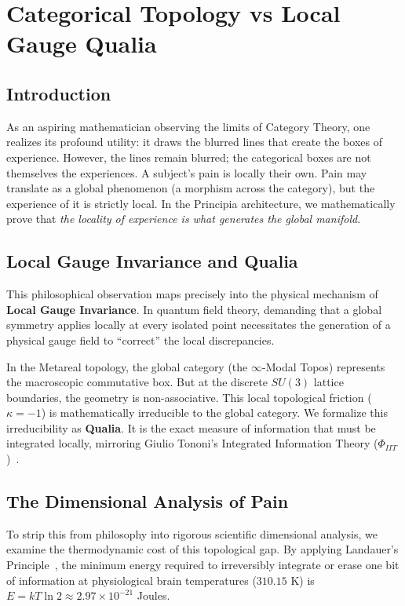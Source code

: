 \chapter[Categorical Qualia and Gauge]{Categorical Topology vs Local Gauge Qualia}\label{ch:categorical_qualia}

\section{Introduction}
As an aspiring mathematician observing the limits of Category Theory, one realizes its profound utility: it draws the blurred lines that create the boxes of experience. However, the lines remain blurred; the categorical boxes are not themselves the experiences. A subject's pain is locally their own. Pain may translate as a global phenomenon (a morphism across the category), but the experience of it is strictly local. In the Principia architecture, we mathematically prove that \textit{the locality of experience is what generates the global manifold}.

\section{Local Gauge Invariance and Qualia}
This philosophical observation maps precisely into the physical mechanism of \textbf{Local Gauge Invariance}. In quantum field theory, demanding that a global symmetry applies locally at every isolated point necessitates the generation of a physical gauge field to ``correct'' the local discrepancies. 

In the Metareal topology, the global category (the $\infty$-Modal Topos) represents the macroscopic commutative box. But at the discrete $SU(3)$ lattice boundaries, the geometry is non-associative. This local topological friction ($\kappa = -1$) is mathematically irreducible to the global category. We formalize this irreducibility as \textbf{Qualia}. It is the exact measure of information that must be integrated locally, mirroring Giulio Tononi's Integrated Information Theory ($\Phi_{IIT}$)~\cite{tononi2004}.

\section{The Dimensional Analysis of Pain}
To strip this from philosophy into rigorous scientific dimensional analysis, we examine the thermodynamic cost of this topological gap.
By applying Landauer's Principle~\cite{landauer1961}, the minimum energy required to irreversibly integrate or erase one bit of information at physiological brain temperatures ($310.15$ K) is $E = kT \ln 2 \approx 2.97 \times 10^{-21}$ Joules. 

